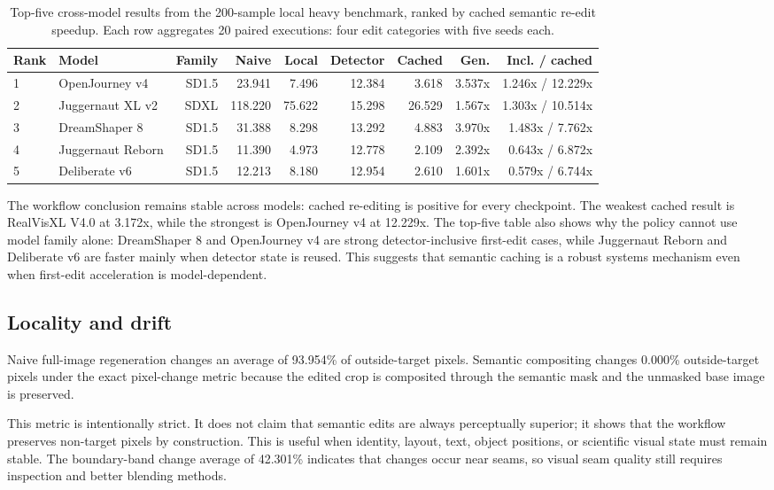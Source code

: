 \documentclass[final,5p,times,number,sort&compress]{elsarticle}
\begin{document}
\begin{table}[t]
\centering
\scriptsize
\caption{Top-five cross-model results from the 200-sample local heavy benchmark, ranked by cached semantic re-edit speedup. Each row aggregates 20 paired executions: four edit categories with five seeds each.}
\label{tab:top5-models}
\begin{tabular}{llrrrrrrr}
\toprule
Rank & Model & Family & Naive & Local & Detector & Cached & Gen. & Incl. / cached \\
\midrule
1 & OpenJourney v4 & SD1.5 & 23.941 & 7.496 & 12.384 & 3.618 & 3.537x & 1.246x / 12.229x \\
2 & Juggernaut XL v2 & SDXL & 118.220 & 75.622 & 15.298 & 26.529 & 1.567x & 1.303x / 10.514x \\
3 & DreamShaper 8 & SD1.5 & 31.388 & 8.298 & 13.292 & 4.883 & 3.970x & 1.483x / 7.762x \\
4 & Juggernaut Reborn & SD1.5 & 11.390 & 4.973 & 12.778 & 2.109 & 2.392x & 0.643x / 6.872x \\
5 & Deliberate v6 & SD1.5 & 12.213 & 8.180 & 12.954 & 2.610 & 1.601x & 0.579x / 6.744x \\
\bottomrule
\end{tabular}
\end{table}

The workflow conclusion remains stable across models: cached re-editing is positive for every checkpoint. The weakest cached result is RealVisXL V4.0 at 3.172x, while the strongest is OpenJourney v4 at 12.229x. The top-five table also shows why the policy cannot use model family alone: DreamShaper 8 and OpenJourney v4 are strong detector-inclusive first-edit cases, while Juggernaut Reborn and Deliberate v6 are faster mainly when detector state is reused. This suggests that semantic caching is a robust systems mechanism even when first-edit acceleration is model-dependent.

\subsection{Locality and drift}

Naive full-image regeneration changes an average of 93.954\% of outside-target pixels. Semantic compositing changes 0.000\% outside-target pixels under the exact pixel-change metric because the edited crop is composited through the semantic mask and the unmasked base image is preserved.

This metric is intentionally strict. It does not claim that semantic edits are always perceptually superior; it shows that the workflow preserves non-target pixels by construction. This is useful when identity, layout, text, object positions, or scientific visual state must remain stable. The boundary-band change average of 42.301\% indicates that changes occur near seams, so visual seam quality still requires inspection and better blending methods.
\end{document}
